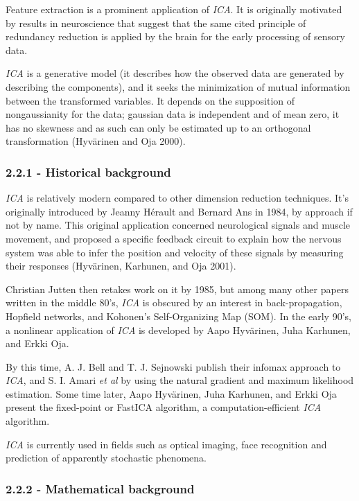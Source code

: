 \documentclass[]{article}
\begin{document}
Feature extraction is a prominent application of \emph{ICA}. It is
originally motivated by results in neuroscience that suggest that the
same cited principle of redundancy reduction is applied by the brain for
the early processing of sensory data.

\emph{ICA} is a generative model (it describes how the observed data are
generated by describing the components), and it seeks the minimization
of mutual information between the transformed variables. It depends on
the supposition of nongaussianity for the data; gaussian data is
independent and of mean zero, it has no skewness and as such can only be
estimated up to an orthogonal transformation (Hyv{ä}rinen and Oja 2000).

\subsubsection{2.2.1 - Historical
background}\label{historical-background-1}

\emph{ICA} is relatively modern compared to other dimension reduction
techniques. It's originally introduced by Jeanny Hérault and Bernard Ans
in 1984, by approach if not by name. This original application concerned
neurological signals and muscle movement, and proposed a specific
feedback circuit to explain how the nervous system was able to infer the
position and velocity of these signals by measuring their responses
(Hyv{ä}rinen, Karhunen, and Oja 2001).

Christian Jutten then retakes work on it by 1985, but among many other
papers written in the middle 80's, \emph{ICA} is obscured by an interest
in back-propagation, Hopfield networks, and Kohonen's Self-Organizing
Map (SOM). In the early 90's, a nonlinear application of \emph{ICA} is
developed by Aapo Hyvärinen, Juha Karhunen, and Erkki Oja.

By this time, A. J. Bell and T. J. Sejnowski publish their infomax
approach to \emph{ICA}, and S. I. Amari \emph{et al} by using the
natural gradient and maximum likelihood estimation. Some time later,
Aapo Hyvärinen, Juha Karhunen, and Erkki Oja present the fixed-point or
FastICA algorithm, a computation-efficient \emph{ICA} algorithm.

\emph{ICA} is currently used in fields such as optical imaging, face
recognition and prediction of apparently stochastic phenomena.

\subsubsection{2.2.2 - Mathematical
background}\label{mathematical-background-1}
\end{document}

